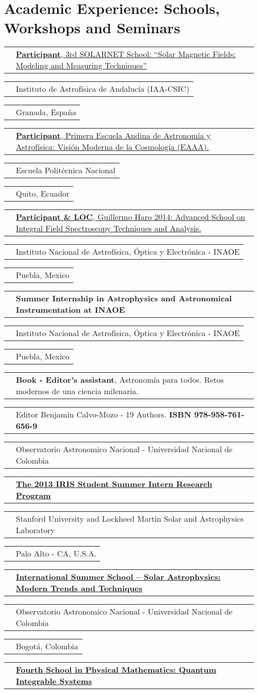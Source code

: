 \documentclass[11pt,letterpaper,sans]{moderncv}        %
\makeatletter
\renewcommand*{\cvitem}[3][.25em]{%
  \begin{tabular}{@{}p{\hintscolumnwidth}@{\hspace{\separatorcolumnwidth}}p{\maincolumnwidth}@{}}%
      \raggedleft\hintstyle{#2} &{#3}%
  \end{tabular}%
  \par\addvspace{#1}}
\makeatother
\begin{document}
\section{Academic Experience: Schools, Workshops and Seminars}
\cvitem{May 18 - 23}{\href{http://spg.iaa.es/School}{\textbf{Participant}, 3rd SOLARNET School: ``Solar Magnetic Fields: Modeling and Measuring Techniques''}}
\cvitem{2015}{Instituto de Astrofísica de Andalucía (IAA-CSIC)}
\cvitem{}{Granada, España}
\cvitem{Dec 8 - 12}{\href{http://departamentodefisicaeventos.epn.edu.ec/}{\textbf{Participant}, Primera Escuela Andina de Astronom\'{i}a y Astrof\'{i}sica: Visi\'on Moderna de la Cosmolog\'{i}a (EAAA).}}
\cvitem{2014}{Escuela Polit\'ecnica Nacional}
\cvitem{}{Quito, Ecuador}
\cvitem{Aug 25-Sep 5}{\href{http://xilonen.inaoep.mx/~progharo/gh2014School/}{\textbf{Participant \& LOC}, Guillermo Haro 2014: Advanced School on Integral Field Spectroscopy Techniques and Analysis.}}
\cvitem{2014}{Instituto Nacional de Astrof\'{i}sica, \'{O}ptica y Electr\'onica - INAOE}
\cvitem{}{Puebla, Mexico}
\cvitem{Jun - Aug}{\textbf{Summer Internship in Astrophysics and Astronomical Instrumentation at INAOE}}
\cvitem{2014}{Instituto Nacional de Astrof\'{i}sica, \'{O}ptica y Electr\'onica - INAOE}
\cvitem{}{Puebla, Mexico}
\cvitem{2014}{\textbf{Book - Editor's assistant}, Astronom\'{i}a para todos. Retos modernos de una ciencia milenaria.}
\cvitem{}{Editor Benjam\'{i}n Calvo-Mozo - 19 Authors. \textbf{ISBN 978-958-761-656-9}}
\cvitem{}{Observatorio Astronomico Nacional - Universidad Nacional de Colombia}
\cvitem{Jun - Aug}{\href{http://solar-center.stanford.edu/IRIS/SummerProgram/}{\textbf{The 2013 IRIS Student Summer Intern Research Program}}}
\cvitem{2013}{Stanford University and Lockheed Martin Solar and Astrophysics Laboratory}
\cvitem{}{Palo Alto - CA, U.S.A.}
\cvitem{Jun - Jul}{\href{http://www.observatorio.unal.edu.co/eventos/solarschool/}{\textbf{International Summer School – Solar Astrophysics: Modern Trends and Techniques}}}
\cvitem{2012}{Observatorio Astronomico Nacional - Universidad Nacional de Colombia}
\cvitem{}{Bogot\'a, Colombia}
\newpage
\cvitem{May 28 - 1}{\href{http://matematicas.uniandes.edu.co/~cursillo_gr/escuela2012/}{\textbf{Fourth School in Physical Mathematics: Quantum Integrable Systems}}}
\end{document}
